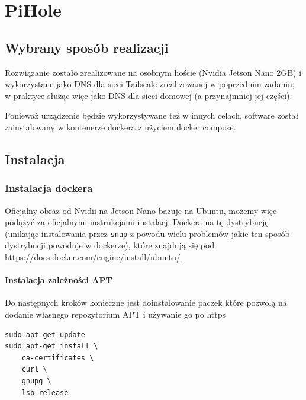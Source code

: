 \documentclass[../main.tex]{subfiles}
\begin{document}
\setcounter{chapter}{5}

\chapter{PiHole}
\label{chap:pihole}
\section{Wybrany sposób realizacji}
Rozwiązanie zostało zrealizowane na osobnym hoście (Nvidia Jetson Nano 2GB) i wykorzystane jako DNS dla sieci Tailscale zrealizowanej w poprzednim zadaniu, w praktyce służąc więc jako DNS dla sieci domowej (a przynajmniej jej części).

Ponieważ urządzenie będzie wykorzystywane też w innych celach, software został zainstalowany w kontenerze dockera z użyciem docker compose.

\section{Instalacja}
\subsection{Instalacja dockera}
Oficjalny obraz od Nvidii na Jetson Nano bazuje na Ubuntu, możemy więc podążyć za oficjalnymi instrukcjami instalacji Dockera na tę dystrybucję (unikając instalowania przez \texttt{snap} z powodu wielu problemów jakie ten sposób dystrybucji powoduje w dockerze), które znajdują się pod \url{https://docs.docker.com/engine/install/ubuntu/}
\subsubsection{Instalacja zależności APT}
Do następnych kroków konieczne jest doinstalowanie paczek które pozwolą na dodanie własnego repozytorium APT i używanie go po https
\begin{verbatim}
sudo apt-get update
sudo apt-get install \
    ca-certificates \
    curl \
    gnupg \
    lsb-release
\end{verbatim}
\end{document}
